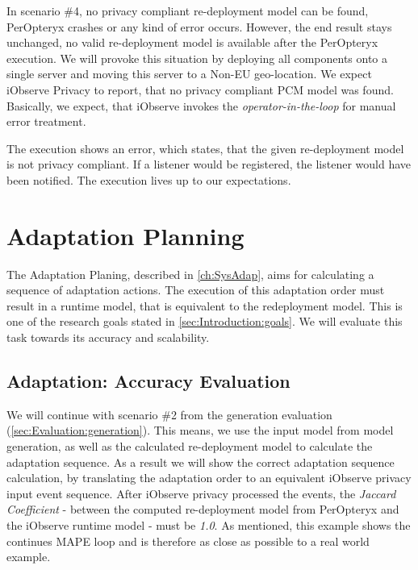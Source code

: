 In scenario \#4, no privacy compliant re-deployment model can be found, PerOpteryx crashes or any kind of error occurs. However, the end result stays unchanged, no valid re-deployment model is available after the PerOpteryx execution. We will provoke this situation by deploying all components onto a single server and moving this server to a Non-EU geo-location. We expect iObserve Privacy to report, that no privacy compliant PCM model was found. Basically, we expect, that iObserve invokes the \textit{operator-in-the-loop} for manual error treatment.

The execution shows an error, which states, that the given re-deployment model is not privacy compliant. If a listener would be registered, the listener would have been notified. The execution lives up to our expectations. 

\section{Adaptation Planning}
\label{sec:Evaluation:planning}

The Adaptation Planing, described in \autoref{ch:SysAdap}, aims for calculating a sequence of adaptation actions. The execution of this adaptation order must result in a runtime model, that is equivalent to the redeployment model. This is one of the research goals stated in \autoref{sec:Introduction:goals}. We will evaluate this task towards its accuracy and scalability.

 
\subsection{Adaptation: Accuracy Evaluation}

We will continue with scenario \#2 from the generation evaluation (\autoref{sec:Evaluation:generation}). This means, we use the input model from model generation, as well as the calculated re-deployment model to calculate the adaptation sequence. As a result we will show the correct adaptation sequence calculation, by translating the adaptation order to an equivalent iObserve privacy input event sequence. After iObserve privacy processed the events, the \textit{Jaccard Coefficient} - between the computed re-deployment model from PerOpteryx and the iObserve runtime model - must be \textit{1.0}. As mentioned, this example shows the continues MAPE loop and is therefore as close as possible to a real world example.


